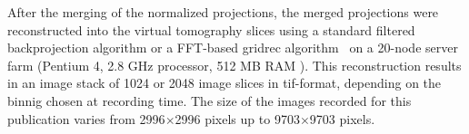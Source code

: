 After the merging of the normalized projections, the merged projections were reconstructed into the virtual tomography slices using a standard filtered backprojection algorithm or a FFT-based gridrec algorithm~\cite{Dowd2003} on a 20-node server farm (Pentium 4, 2.8 GHz processor, 512 MB RAM ). This reconstruction results in an image stack of 1024 or 2048 image slices in tif-format, depending on the binnig chosen at recording time. The size of the images recorded for this publication varies from 2996$\times$2996 pixels up to 9703$\times$9703 pixels.